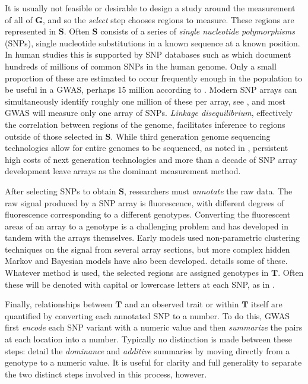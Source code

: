 \documentclass[sts]{imsart}
\newcommand{\m}[1]{\mathbf{#1}}               %
\begin{document}
It is usually not feasible or desirable to design a study around the measurement of all of $\m{G}$, and so the \emph{select} step chooses regions to measure. These regions are represented in $\m{S}$. Often $\m{S}$ consists of a series of \emph{single nucleotide polymorphisms} (SNPs), single nucleotide substitutions in a known sequence at a known position. In human studies this is supported by SNP databases such as \cite{NCBIdbSNP} which document hundreds of millions of common SNPs in the human genome. Only a small proportion of these are estimated to occur frequently enough in the population to be useful in a GWAS, perhaps 15 million according to \cite{koboldtetal2013next}. Modern SNP arrays can simultaneously identify roughly one million of these per array, see \cite{laframboise2009, tametal2019benefits}, and most GWAS will measure only one array of SNPs. \emph{Linkage disequilibrium}, effectively the correlation between regions of the genome, facilitates inference to regions outside of those selected in $\m{S}$. While third generation genome sequencing technologies allow for entire genomes to be sequenced, as noted in \cite{heatherchain2016sequencers, hasinetal2017multi, uffelmannetal2021gwas}, persistent high costs of next generation technologies and more than a decade of SNP array development leave arrays as the dominant measurement method.

After selecting SNPs to obtain $\m{S}$, researchers must \emph{annotate} the raw data. The raw signal produced by a SNP array is fluorescence, with different degrees of fluorescence corresponding to a different genotypes. Converting the fluorescent areas of an array to a genotype is a challenging problem and has developed in tandem with the arrays themselves. Early models used non-parametric clustering techniques on the signal from several array sections, but more complex hidden Markov and Bayesian models have also been developed. \cite{laframboise2009} details some of these. Whatever method is used, the selected regions are assigned genotypes in $\m{T}$. Often these will be denoted with capital or lowercase letters at each SNP, as in \cite{siegmundyakir2007, visschergoddard2019}.

Finally, relationships between $\m{T}$ and an observed trait or within $\m{T}$ itself are quantified by converting each annotated SNP to a number. To do this, GWAS first \emph{encode} each SNP variant with a numeric value and then \emph{summarize} the pairs at each location into a number. Typically no distinction is made between these steps: \cite{LanderBotstein1989, cheverud2001, siegmundyakir2007} detail the \emph{dominance} and \emph{additive} summaries by moving directly from a genotype to a numeric value. It is useful for clarity and full generality to separate the two distinct steps involved in this process, however.
\end{document}
